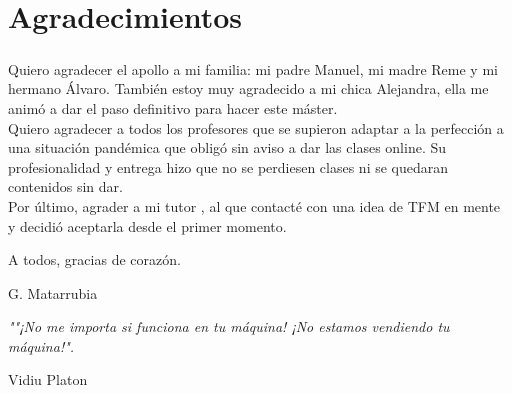 \chapter{Agradecimientos}\label{sec:agradecimientos}

\paragraph{}Quiero agradecer el apollo a mi familia: mi padre Manuel, mi madre Reme y mi hermano Álvaro.
También estoy muy agradecido a mi chica Alejandra, ella me animó a dar el paso definitivo para hacer este
máster. \\
Quiero agradecer a todos los profesores que se supieron adaptar a la perfección a una situación
pandémica que obligó sin aviso a dar las clases online. Su profesionalidad y entrega hizo que no
se perdiesen clases ni se quedaran contenidos sin dar. \\
Por último, agrader a mi tutor \TUTOR, al que contacté con una idea de TFM en mente y decidió
aceptarla desde el primer momento.

A todos, gracias de corazón.


\begin{flushright}
G. Matarrubia
\end{flushright}

%
\vspace*{\fill}

\emph{""¡No me importa si funciona en tu máquina! ¡No estamos vendiendo tu máquina!".}

\begin{flushright}
	Vidiu Platon
\end{flushright}

\vspace*{\fill}
%

\cleardoublepage